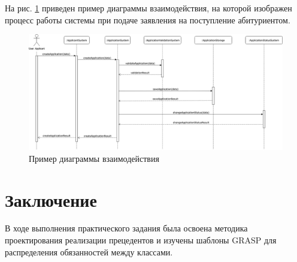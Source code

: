 \documentclass[a4paper, 14pt]{extarticle}
\begin{document}
На рис. \ref{fig:diagram} приведен пример диаграммы взаимодействия, на которой
изображен процесс работы системы при подаче заявления на поступление
абитуриентом.

\begin{figure}[H]
  \centering
  \includegraphics[width=\textwidth]{images/diagram.png}
  \caption{Пример диаграммы взаимодействия}
  \label{fig:diagram}
\end{figure}

\newpage

\section{Заключение}

В ходе выполнения практического задания была освоена методика проектирования
реализации прецедентов и изучены шаблоны GRASP для распределения обязанностей
между классами.
\end{document}

